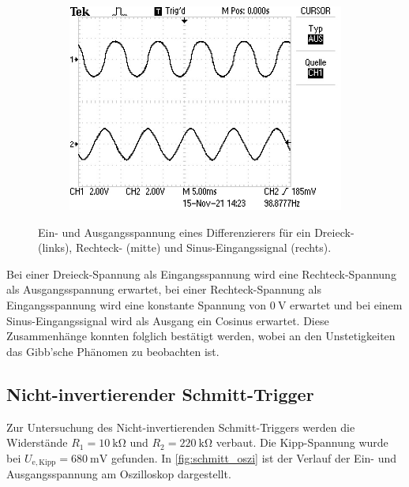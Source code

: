 \begin{figure}[H]
\begin{subfigure}{.4\textwidth}
    \includegraphics[width=\linewidth]{data/ALL0064/F0064TEK.JPG}
  \end{subfigure}
  \caption{Ein- und Ausgangsspannung eines Differenzierers für ein Dreieck- (links), Rechteck- (mitte) und Sinus-Eingangssignal (rechts).}
  \label{fig:diff_oszi}
\end{figure}


Bei einer Dreieck-Spannung als Eingangsspannung wird eine Rechteck-Spannung als Ausgangsspannung erwartet, bei einer Rechteck-Spannung als Eingangsspannung wird eine konstante Spannung von $\SI{0}{\volt}$ erwartet und bei einem Sinus-Eingangssignal wird als Ausgang ein Cosinus erwartet. Diese Zusammenhänge konnten folglich bestätigt werden, wobei an den Unstetigkeiten das Gibb'sche Phänomen zu beobachten ist.

\subsection{Nicht-invertierender Schmitt-Trigger}

Zur Untersuchung des Nicht-invertierenden Schmitt-Triggers werden die Widerstände $R_1 = \SI{10}{\kilo\ohm}$ und $R_2 = \SI{220}{\kilo\ohm}$ verbaut. Die Kipp-Spannung wurde bei $U_{\mathrm{e, Kipp}} = \SI{680}{\milli\volt}$ gefunden. In \autoref{fig:schmitt_oszi} ist der Verlauf der Ein- und Ausgangsspannung am Oszilloskop dargestellt.

